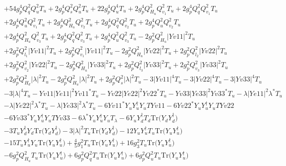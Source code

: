 \begin{align}
 &+54 g_{p}^{4} Q_{q}^{2} Q_{u}^{2} T_u +2 g_{p}^{4} Q_{s}^{2} Q_{u}^{2} T_u +22 g_{p}^{4} Q_{u}^{4} T_u +2 g_{p}^{4} Q_{H_u}^{2} Q_{v_1}^{2} T_u +2 g_{p}^{4} Q_{q}^{2} Q_{v_1}^{2} T_u \nonumber \\ 
 &+2 g_{p}^{4} Q_{u}^{2} Q_{v_1}^{2} T_u +2 g_{p}^{4} Q_{H_u}^{2} Q_{v_2}^{2} T_u +2 g_{p}^{4} Q_{q}^{2} Q_{v_2}^{2} T_u +2 g_{p}^{4} Q_{u}^{2} Q_{v_2}^{2} T_u \nonumber \\ 
 &+2 g_{p}^{4} Q_{H_u}^{2} Q_{v_3}^{2} T_u +2 g_{p}^{4} Q_{q}^{2} Q_{v_3}^{2} T_u +2 g_{p}^{4} Q_{u}^{2} Q_{v_3}^{2} T_u -2 g_{p}^{2} Q_{H_u}^{2} |Yv11|^2 T_u \nonumber \\ 
 &+2 g_{p}^{2} Q_{l_1}^{2} |Yv11|^2 T_u +2 g_{p}^{2} Q_{v_1}^{2} |Yv11|^2 T_u -2 g_{p}^{2} Q_{H_u}^{2} |Yv22|^2 T_u +2 g_{p}^{2} Q_{l_2}^{2} |Yv22|^2 T_u \nonumber \\ 
 &+2 g_{p}^{2} Q_{v_2}^{2} |Yv22|^2 T_u -2 g_{p}^{2} Q_{H_u}^{2} |Yv33|^2 T_u +2 g_{p}^{2} Q_{l_3}^{2} |Yv33|^2 T_u +2 g_{p}^{2} Q_{v_3}^{2} |Yv33|^2 T_u \nonumber \\ 
 &+2 g_{p}^{2} Q_{H_d}^{2} |\lambda|^2 T_u -2 g_{p}^{2} Q_{H_u}^{2} |\lambda|^2 T_u +2 g_{p}^{2} Q_{s}^{2} |\lambda|^2 T_u -3 |Yv11|^4 T_u -3 |Yv22|^4 T_u -3 |Yv33|^4 T_u \nonumber \\ 
 &-3 |\lambda|^4 T_u - Yv11 |Ye11|^2 Yv11^* T_u - Yv22 |Ye22|^2 Yv22^* T_u - Yv33 |Ye33|^2 Yv33^* T_u - \lambda |Ye11|^2 \lambda^* T_u \nonumber \\ 
 &- \lambda |Ye22|^2 \lambda^* T_u - \lambda |Ye33|^2 \lambda^* T_u -6 Yv11^* {Y_u  Y_{u}^{\dagger}  Y_u} TYv11 -6 Yv22^* {Y_u  Y_{u}^{\dagger}  Y_u} TYv22 \nonumber \\ 
 &-6 Yv33^* {Y_u  Y_{u}^{\dagger}  Y_u} TYv33 -6 \lambda^* {Y_u  Y_{u}^{\dagger}  Y_u} T_{\lambda} -6 {Y_u  Y_{d}^{\dagger}  T_d} \mbox{Tr}\Big({Y_d  Y_{d}^{\dagger}}\Big) \nonumber \\ 
 &-3 {T_u  Y_{d}^{\dagger}  Y_d} \mbox{Tr}\Big({Y_d  Y_{d}^{\dagger}}\Big) -3 |\lambda|^2 T_u \mbox{Tr}\Big({Y_d  Y_{d}^{\dagger}}\Big) -12 {Y_u  Y_{u}^{\dagger}  T_u} \mbox{Tr}\Big({Y_u  Y_{u}^{\dagger}}\Big) \nonumber \\ 
 &-15 {T_u  Y_{u}^{\dagger}  Y_u} \mbox{Tr}\Big({Y_u  Y_{u}^{\dagger}}\Big) +\frac{4}{5} g_{1}^{2} T_u \mbox{Tr}\Big({Y_u  Y_{u}^{\dagger}}\Big) +16 g_{3}^{2} T_u \mbox{Tr}\Big({Y_u  Y_{u}^{\dagger}}\Big) \nonumber \\ 
 &-6 g_{p}^{2} Q_{H_u}^{2} T_u \mbox{Tr}\Big({Y_u  Y_{u}^{\dagger}}\Big) +6 g_{p}^{2} Q_{q}^{2} T_u \mbox{Tr}\Big({Y_u  Y_{u}^{\dagger}}\Big) +6 g_{p}^{2} Q_{u}^{2} T_u \mbox{Tr}\Big({Y_u  Y_{u}^{\dagger}}\Big) \nonumber \\ 

\end{align}
